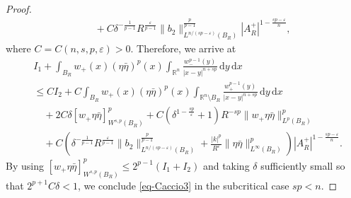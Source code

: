 \documentclass[11pt]{amsart}
\theoremstyle{plain}
\theoremstyle{definition}
\numberwithin{equation}{section}
\begin{document}
\begin{proof}
\begin{equation*}
\begin{split}
&\quad+ C\delta^{-\frac{1}{p-1}} R^{\frac{\varepsilon}{p-1}}\|b_2\|^{\frac{p}{p-1}}_{L^{n/(sp-\varepsilon)}(B_R)}|A^+_R|^{1-\frac{sp-\varepsilon}{n}},
\end{split}
\end{equation*}
where $C=C(n, s, p, \varepsilon)>0$. Therefore, we arrive at
\begin{equation*}
\begin{split}
&I_1 + \int_{B_R} w_+(x) (\eta \bar{\eta})^p(x) \int_{\mathbb{R}^n} \frac{w_-^{p-1}(y)}{|x-y|^{n+sp}} \,\mathrm{d}y \,\mathrm{d}x \\
&\leq CI_2 + C \int_{B_R} w_+(x)(\eta\bar{\eta})^p(x) \int_{\mathbb{R}^n \setminus B_R} \frac{w_+^{p-1}(y)}{|x-y|^{n+sp}} \,\mathrm{d}y \,\mathrm{d}x \\
&\quad + 2C\delta [w_+\eta\bar{\eta}]_{W^{s, p}(B_R)}^p + C \left( \delta^{1-\frac{sp}{\varepsilon}} + 1 \right) R^{-sp} \|w_+\eta\bar{\eta}\|_{L^p(B_R)}^p \\
&\quad + C \left( \delta^{-\frac{1}{p-1}} R^{\frac{\varepsilon}{p-1}}\|b_2\|^{\frac{p}{p-1}}_{L^{n/(sp-\varepsilon)}(B_R)} + \frac{|k|^p}{R^{\varepsilon}} \|\eta\bar{\eta}\|_{L^\infty(B_R)}^p \right) |A^+_R|^{1-\frac{sp-\varepsilon}{n}}.
\end{split}
\end{equation*}
By using $[w_+\eta\bar{\eta}]_{W^{s, p}(B_R)}^p \leq 2^{p-1} (I_1+I_2)$ and taking $\delta$ sufficiently small so that $2^{p+1}C\delta<1$, we conclude \eqref{eq-Caccio3} in the subcritical case $sp<n$.


\end{proof}
\end{document}
